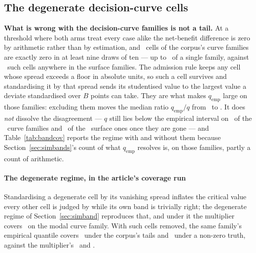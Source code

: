\subsection{The degenerate decision-curve cells}
\label{app:degencells}


\textbf{What is wrong with the decision-curve families is not a tail.} At a
threshold where both arms treat every case alike the net-benefit difference
is zero by arithmetic rather than by estimation, and \nDegenerateCellsDca\
cells of the corpus's curve families are exactly zero in at least nine draws
of ten --- up to \shareDegenerateDcaMaxPct\ of a single family, against
\nDegenerateCellsWhole\ such cells anywhere in the surface families. The
admission rule keeps any cell whose spread exceeds a floor in absolute units,
so such a cell survives and standardising it by that spread sends its
studentised value to the largest value a deviate standardised over $B$ points
can take. They are what makes $q_{\mathrm{emp}}$ large on those families:
excluding them moves the median ratio $q_{\mathrm{emp}}/q$ from
\ratioDcaAll\ to \ratioDcaAdmissible. It does \emph{not} dissolve the
disagreement --- $q$ still lies below the empirical interval on
\nQbelowEmpDcaAdmissible\ of the \nFamiliesDca\ curve families and
\nQbelowEmpWholeAdmissible\ of the \nFamiliesWhole\ surface ones once they
are gone --- and Table~\ref{tab:bandcov} reports the regime with and without
them because Section~\ref{sec:simbands}'s count of what
$q_{\mathrm{emp}}$ resolves is, on those families, partly a count of
arithmetic.

\paragraph{The degenerate regime, in the article's coverage run}
Standardising a degenerate cell by its vanishing spread inflates the critical
value every other cell is judged by while its own band is trivially right;
the degenerate regime of Section~\ref{sec:simband} reproduces that, and under
it the multiplier covers \covMultDegenDcaAtDesign\ on the modal curve
family. With such cells removed, the same family's empirical
quantile covers \covEmpHeavyDcaAtDesign\ under the corpus's tails and
\covEmpNonzeroDcaAtDesign\ under a non-zero truth, against the multiplier's
\covMultHeavyDcaAtDesign\ and \covMultNonzeroDcaAtDesign.

